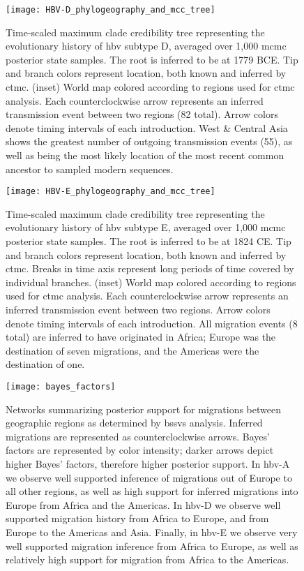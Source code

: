 \begin{figure}[ht]
  \centering
  \medskip
  \texttt{[image: HBV-D\_phylogeography\_and\_mcc\_tree]}
  \caption[HBV-D Phylogeography]{Time-scaled maximum clade credibility tree representing the evolutionary history of \gls{hbv} subtype D, averaged over 1,000 \gls{mcmc} posterior state samples. The root is inferred to be at 1779 BCE. Tip and branch colors represent location, both known and inferred by \gls{ctmc}. (inset) World map colored according to regions used for \gls{ctmc} analysis. Each counterclockwise arrow represents an inferred transmission event between two regions (82 total). Arrow colors denote timing intervals of each introduction. West \& Central Asia shows the greatest number of outgoing transmission events (55), as well as being the most likely location of the most recent common ancestor to sampled modern sequences.}
  \label{fig:HBV-D_phylogeo}
\end{figure}

\begin{figure}[ht]
  \centering
  \medskip
  \texttt{[image: HBV-E\_phylogeography\_and\_mcc\_tree]}
  \caption[HBV-E Phylogeography]{Time-scaled maximum clade credibility tree representing the evolutionary history of \gls{hbv} subtype E, averaged over 1,000 \gls{mcmc} posterior state samples. The root is inferred to be at 1824 CE. Tip and branch colors represent location, both known and inferred by \gls{ctmc}. Breaks in time axis represent long periods of time covered by individual branches. (inset) World map colored according to regions used for \gls{ctmc} analysis. Each counterclockwise arrow represents an inferred transmission event between two regions. Arrow colors denote timing intervals of each introduction. All migration events (8 total) are inferred to have originated in Africa; Europe was the destination of seven migrations, and the Americas were the destination of one.}
  \label{fig:HBV-E_phylogeo}
\end{figure}

\begin{figure}[ht]
  \centering
  \medskip
  \texttt{[image: bayes\_factors]}
  \caption[Bayes' factors of \gls{hbv} geographic transitions]{Networks summarizing posterior support for migrations between geographic regions as determined by \gls{bssvs} analysis. Inferred migrations are represented as counterclockwise arrows. Bayes' factors are represented by color intensity; darker arrows depict higher Bayes' factors, therefore higher posterior support. In \gls{hbv}-A we observe well supported inference of migrations out of Europe to all other regions, as well as high support for inferred migrations into Europe from Africa and the Americas. In \gls{hbv}-D we observe well supported migration history from Africa to Europe, and from Europe to the Americas and Asia. Finally, in \gls{hbv}-E we observe very well supported migration inference from Africa to Europe, as well as relatively high support for migration from Africa to the Americas.}
  \label{fig:bayes_factors}
\end{figure}

